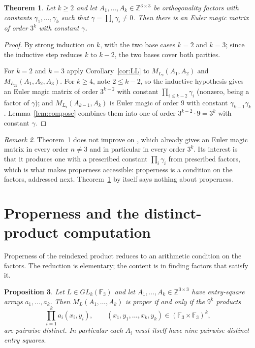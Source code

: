 \documentclass[11pt,a4paper]{amsart}
\theoremstyle{plain}
\newtheorem{theorem}{Theorem}[section]
\newtheorem{proposition}[theorem]{Proposition}
\theoremstyle{definition}
\theoremstyle{remark}
\newtheorem{remark}[theorem]{Remark}
\newcommand{\FF}{\mathbb{F}}
\newcommand{\ZZ}{\mathbb{Z}}
\begin{document}
\begin{theorem}\label{thm:general}
Let $k\ge2$ and let $A_1,\dots,A_k\in\ZZ^{3\times3}$ be orthogonality factors
with constants $\gamma_1,\dots,\gamma_k$ such that $\gamma=\prod_i\gamma_i\ne0$.
Then there is an Euler magic matrix of order $3^k$ with constant $\gamma$.
\end{theorem}

\begin{proof}
By strong induction on $k$, with the two base cases $k=2$ and $k=3$; since the
inductive step reduces $k$ to $k-2$, the two bases cover both parities.

For $k=2$ and $k=3$ apply Corollary~\ref{cor:LL} to $M_{L_9}(A_1,A_2)$ and
$M_{L_{27}}(A_1,A_2,A_3)$. For $k\ge4$, note $2\le k-2$, so the inductive
hypothesis gives an Euler magic matrix of order $3^{k-2}$ with constant
$\prod_{i\le k-2}\gamma_i$ (nonzero, being a factor of $\gamma$); and
$M_{L_9}(A_{k-1},A_k)$ is Euler magic of order $9$ with constant
$\gamma_{k-1}\gamma_k$. Lemma~\ref{lem:compose} combines them into one of order
$3^{k-2}\cdot9=3^k$ with constant $\gamma$.
\end{proof}

\begin{remark}
Theorem~\ref{thm:general} does not improve on
\cite[Theorem~4.1]{Muller2026}, which already gives an Euler magic matrix in
every order $n\ne3$ and in particular in every order $3^k$. Its interest is
that it produces one with a prescribed constant $\prod_i\gamma_i$ from
prescribed factors, which is what makes properness accessible: properness is a
condition on the factors, addressed next. Theorem~\ref{thm:general} by itself
says nothing about properness.
\end{remark}

\section{Properness and the distinct-product computation}\label{sec:proper}

Properness of the reindexed product reduces to an arithmetic condition on the
factors. The reduction is elementary; the content is in finding factors that
satisfy it.

\begin{proposition}\label{prop:properness}
Let $L\in GL_k(\FF_3)$ and let $A_1,\dots,A_k\in\ZZ^{3\times3}$ have
entry-square arrays $a_1,\dots,a_k$. Then $M_L(A_1,\dots,A_k)$ is proper if and
only if the $9^k$ products
\[
\prod_{i=1}^{k} a_i(x_i,y_i),
\qquad (x_1,y_1,\dots,x_k,y_k)\in(\FF_3\times\FF_3)^k,
\]
are pairwise distinct. In particular each $A_i$ must itself have nine pairwise
distinct entry squares.
\end{proposition}
\end{document}
